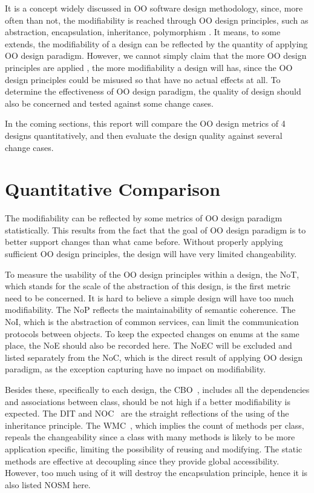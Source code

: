 \documentclass[conference]{IEEEtran}
\begin{document}
	It is a concept widely discussed in \gls{OO} software design methodology, since, more often than not, the modifiability is reached through \gls{OO} design principles, such as abstraction, encapsulation, inheritance, polymorphism \cite{4}. It means, to some extends, the modifiability of a design can be reflected by the quantity of applying \gls{OO} design paradigm. However, we cannot simply claim that the more \gls{OO} design principles are applied \cite{3}, the more modifiability a design will has, since the \gls{OO} design principles could be misused so that have no actual effects at all. To determine the effectiveness of \gls{OO} design paradigm, the quality of design should also be concerned and tested against some change cases.
	
	In the coming sections, this report will compare the \gls{OO} design metrics of 4 designs quantitatively, and then evaluate the design quality against several change cases.
	
	\section{Quantitative Comparison}
	The modifiability can be reflected by some metrics of \gls{OO} design paradigm statistically. This results from the fact that the goal of \gls{OO} design paradigm is to better support changes than what came before. Without properly applying sufficient \gls{OO} design principles, the design will have very limited changeability.
	
	To measure the usability of the \gls{OO} design principles within a design, the \gls{NoT}, which stands for the scale of the abstraction of this design, is the first metric need to be concerned. It is hard to believe a simple design will have too much modifiability. The \gls{NoP} reflects the maintainability of semantic coherence. The \gls{NoI}, which is the abstraction of common services, can limit the communication protocols between objects. To keep the expected changes on enums at the same place, the \gls{NoE} should also be recorded here. The \gls{NoEC} will be excluded and listed separately from the \gls{NoC}, which is the direct result of applying \gls{OO} design paradigm, as the exception capturing have no impact on modifiability. 
	
	Besides these, specifically to each design, the \gls{CBO}~\cite{1}, includes all the dependencies and associations between class, should be not high if a better modifiability is expected. The \gls{DIT} and \gls{NOC}~\cite{1} are the straight reflections of the using of the inheritance principle. The \gls{WMC}~\cite{1}, which implies the count of methods per class, repeals the changeability since a class with many methods is likely to be more application specific, limiting the possibility of reusing and modifying. The static methods are effective at decoupling since they provide global accessibility. However, too much using of it will destroy the encapsulation principle, hence it is also listed \gls{NOSM} here.  
	
\end{document}
